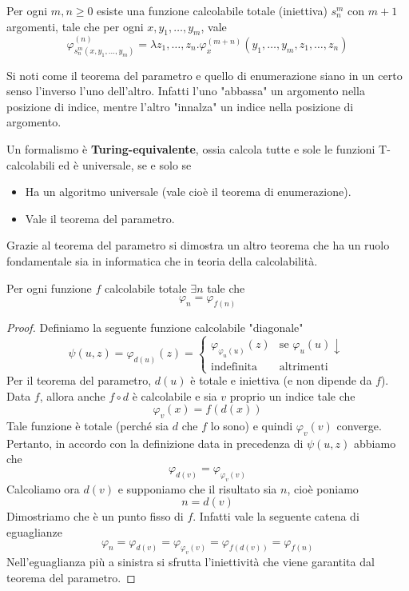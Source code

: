 \begin{theorem}
	\label{th: s-m-n}
	Per ogni $m, n \geq 0$ esiste una funzione calcolabile
	totale (iniettiva) $s_n^m$ con $m+1$ argomenti, tale che
	per ogni $x, y_1, \dots, y_m$, vale
	\[
		\varphi_{s_n^m (x, y_1, \dots, y_m)}^{(n)} =
		\lambda z_1, \dots, z_n .
		\varphi_x^{(m+n)} (y_1, \dots, y_m, z_1, \dots, z_n)
	\]
\end{theorem}

Si noti come il teorema del parametro e quello di enumerazione
siano in un certo senso l'inverso l'uno dell'altro. Infatti
l'uno "abbassa" un argomento nella posizione di indice, mentre
l'altro "innalza" un indice nella posizione di argomento.

\begin{theorem}[Espressività]
	Un formalismo è \textbf{Turing-equivalente}, ossia calcola
	tutte e sole le funzioni T-calcolabili ed è universale, se
	e solo se
	\begin{itemize}
		\item Ha un algoritmo universale (vale cioè il teorema
		      di enumerazione).
		\item Vale il teorema del parametro.
	\end{itemize}
\end{theorem}

Grazie al teorema del parametro si dimostra un altro teorema
che ha un ruolo fondamentale sia in informatica che in teoria
della calcolabilità.

\begin{theorem} \label{th: punto_fisso}
	Per ogni funzione $f$ calcolabile totale $\exists n$ tale
	che
	\[ \varphi_n = \varphi_{f(n)} \]
	\begin{proof}
		Definiamo la seguente funzione calcolabile "diagonale"
		\[
			\psi (u, z) = \varphi_{d(u)} (z) =
			\begin{cases}
				\varphi_{\varphi_u (u)} (z) &
				\text{se } \varphi_u (u) \downarrow \\
				\text{indefinita}           &
				\text{altrimenti}
			\end{cases}
		\]
		Per il teorema del parametro, $d(u)$ è totale e
		iniettiva (e non dipende da $f$). Data $f$, allora
		anche $f \circ d$ è calcolabile e sia $v$ proprio
		un indice tale che
		\[ \varphi_v(x) = f(d(x)) \]
		Tale funzione è totale (perché sia $d$ che $f$ lo sono)
		e quindi $\varphi_v (v)$ converge. Pertanto, in accordo
		con la definizione data in precedenza di $\psi (u,z)$
		abbiamo che
		\[ \varphi_{d(v)} = \varphi_{\varphi_v(v)} \]
		Calcoliamo ora $d(v)$ e supponiamo che il risultato sia
		$n$, cioè poniamo
		\[ n = d(v) \]
		Dimostriamo che è un punto fisso di $f$. Infatti vale
		la seguente catena di eguaglianze
		\[
			\varphi_n  = \varphi_{d(v)}
			= \varphi_{\varphi_v (v)}
			= \varphi_{f(d(v))}
			= \varphi_{f(n)}
		\]
		Nell'eguaglianza più a sinistra si sfrutta l'iniettività
		che viene garantita dal teorema del parametro.
	\end{proof}
\end{theorem}

